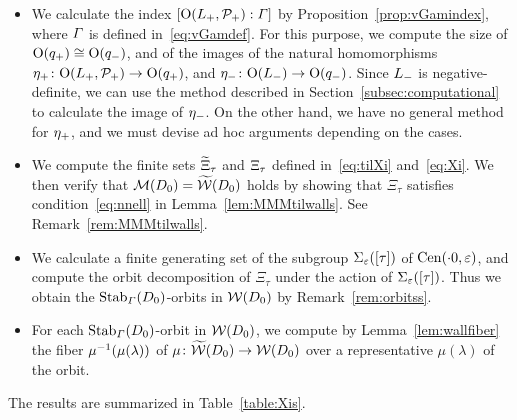 \documentclass{amsart} %
\begin{document}
\begin{itemize}
\item 
We calculate the index $[\mathord{\mathrm{O}}(L_{+}, \mathord{\mathcal{P}}_{+}): \varGamma]$ 
by Proposition~\ref{prop:vGamindex},
where $\varGamma$ is defined in~\eqref{eq:vGamdef}.
 For this purpose, 
we compute the size of $\mathord{\mathrm{O}}(q_{+})\cong \mathord{\mathrm{O}}(q_{-})$, 
and of 
the images of the natural homomorphisms 
${\eta}_{+}\colon \mathord{\mathrm{O}}(L_{+}, \mathord{\mathcal{P}}_{+})\to \mathord{\mathrm{O}}(q_{+})$, 
and
${\eta}_{-}\colon \mathord{\mathrm{O}}(L_{-})\to \mathord{\mathrm{O}}(q_{-})$.
Since $L_{-}$ is negative-definite,
we can use  the method described in  Section~\ref{subsec:computational}
to calculate  the image of ${\eta}_{-}$.
On the other hand, 
we have  no general method for ${\eta}_{+}$, and we must devise ad hoc arguments depending on the cases.
\item 
We  compute the finite sets $\widetilde{\Xi}_{\tau}$ and $\Xi_{\tau}$
defined in~\eqref{eq:tilXi} and~\eqref{eq:Xi}.
%
%
We then verify that $\mathord{\mathcal{M}}(D_0)=\widetilde{\mathord{\mathcal{W}}} (D_0)$ holds
by showing that $\Xi_{\tau}$ satisfies  condition~\eqref{eq:nnell}
in Lemma~\ref{lem:MMMtilwalls}.
See Remark~\ref{rem:MMMtilwalls}.
\item 
We calculate a finite generating set of 
the subgroup $\Sigma_{\varepsilon}([\tau])$ of $\mathrm{Cen}(\cdot 0, \varepsilon)$,
and compute the orbit decomposition of  $\Xi_{\tau}$ under the action of $\Sigma_{\varepsilon}([\tau])$.
Thus we obtain 
the $\operatorname{Stab}_{\varGamma}(D_0)$-orbits in $\mathord{\mathcal{W}}(D_0)$
by Remark~\ref{rem:orbitss}.
\item
For each $\operatorname{Stab}_{\varGamma}(D_0)$-orbit in $\mathord{\mathcal{W}}(D_0)$,
we compute by Lemma~\ref{lem:wallfiber} the  fiber $\mu^{-1}(\mu(\lambda))$ of $\mu\colon \widetilde{\mathord{\mathcal{W}}}(D_0)\to \mathord{\mathcal{W}}(D_0)$
over a representative $\mu(\lambda)$ of the orbit.
\end{itemize}
%
The results are summarized in Table~\ref{table:Xis}.
%
%
\end{document}
